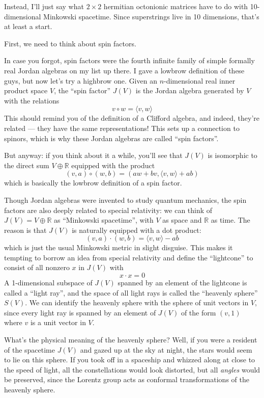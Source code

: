 \documentclass{article}
\begin{document}
Instead, I'll just say what \(2\times2\) hermitian octonionic matrices
have to do with 10-dimensional Minkowski spacetime. Since superstrings
live in 10 dimensions, that's at least a start.

First, we need to think about spin factors.

In case you forgot, spin factors were the fourth infinite family of
simple formally real Jordan algebras on my list up there. I gave a
lowbrow definition of these guys, but now let's try a highbrow one.
Given an \(n\)-dimensional real inner product space \(V\), the ``spin
factor'' \(J(V)\) is the Jordan algebra generated by \(V\) with the
relations \[v\circ w = \langle v,w\rangle\] This should remind you of
the definition of a Clifford algebra, and indeed, they're related ---
they have the same representations! This sets up a connection to
spinors, which is why these Jordan algebras are called ``spin factors''.

But anyway: if you think about it a while, you'll see that \(J(V)\) is
isomorphic to the direct sum \(V\oplus\mathbb{R}\) equipped with the
product \[(v,a)\circ(w,b) = (aw + bv, \langle v,w\rangle + ab)\] which
is basically the lowbrow definition of a spin factor.

Though Jordan algebras were invented to study quantum mechanics, the
spin factors are also deeply related to special relativity: we can think
of \(J(V) = V\oplus\mathbb{R}\) as ``Minkowski spacetime'', with \(V\)
as space and \(\mathbb{R}\) as time. The reason is that \(J(V)\) is
naturally equipped with a dot product:
\[(v,a)\cdot(w,b) = \langle v,w\rangle - ab\] which is just the usual
Minkowski metric in slight disguise. This makes it tempting to borrow an
idea from special relativity and define the ``lightcone'' to consist of
all nonzero \(x\) in \(J(V)\) with \[x\cdot x = 0\] A 1-dimensional
subspace of \(J(V)\) spanned by an element of the lightcone is called a
``light ray'', and the space of all light rays is called the ``heavenly
sphere'' \(S(V)\). We can identify the heavenly sphere with the sphere
of unit vectors in \(V\), since every light ray is spanned by an element
of \(J(V)\) of the form \((v,1)\) where \(v\) is a unit vector in \(V\).

What's the physical meaning of the heavenly sphere? Well, if you were a
resident of the spacetime \(J(V)\) and gazed up at the sky at night, the
stars would seem to lie on this sphere. If you took off in a spaceship
and whizzed along at close to the speed of light, all the constellations
would look distorted, but all \emph{angles} would be preserved, since
the Lorentz group acts as conformal transformations of the heavenly
sphere.
\end{document}

